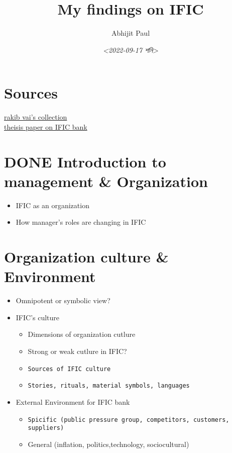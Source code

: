 \documentclass[11pt]{article}
\author{Abhijit Paul}
\date{\textit{<2022-09-17 শনি>}}
\title{My findings on IFIC}
\begin{document}
\maketitle
\clearpage \tableofcontents \clearpage


\section{Sources}
\label{sec:orgb46cb09}
\href{https://rakib3004.github.io/Tech-Edu-Assistant/doc/Pdf3/BusinessStudies.html}{rakib vai's collection}\\
\href{https://core.ac.uk/download/pdf/61805073.pdf}{theisis paper on IFIC bank}\\
\section{{\bfseries\sffamily DONE} Introduction to management \& Organization}
\label{sec:org58d3a8c}
\begin{itemize}
\item IFIC as an organization\\
\item How manager's roles are changing in IFIC\\
\end{itemize}
\section{Organization culture \& Environment}
\label{sec:orgde5716a}
\begin{itemize}
\item Omnipotent or symbolic view?\\
\item IFIC's culture\\
\begin{itemize}
\item Dimensions of organization cutlure\\
\item Strong or weak cutlure in IFIC?\\
\item \texttt{Sources of IFIC culture}\\
\item \texttt{Stories, rituals, material symbols, languages}\\
\end{itemize}
\item External Environment for IFIC bank\\
\begin{itemize}
\item \texttt{Spicific (public pressure group, competitors, customers, suppliers)}\\
\item General (inflation, politics,technology, sociocultural)\\
\end{itemize}
\end{itemize}
\end{document}
